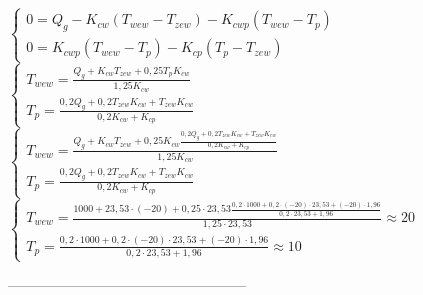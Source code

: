 \documentclass{article}
\begin{document}
\begin{center}
\vspace{1ex}
    $
    \begin{cases}
        0=Q_{g} -K_{cw} (T_{wew} - T_{zew})-K_{cwp} (T_{wew} -T_{p})\\
        0=K_{cwp}(T_{wew}-T_{p})-K_{cp}(T_{p}-T_{zew})
    \end{cases}
    $
    \\
    \vspace{1ex}
    $
    \begin{cases}
        T_{wew}=\frac{Q_{g}+K_{cw}T_{zew}+0,25T_{p}K_{cw}}{1,25K_{cw}}\\
        T_{p}=\frac{0,2Q_{g}+0,2T_{zew}K_{cw}+T_{zew}K_{cw}}{0,2K_{cw}+K_{cp}}
    \end{cases}
    $
    \\
    \vspace{1ex}
    $
    \begin{cases}
        T_{wew}=\frac{Q_{g}+K_{cw}T_{zew}+0,25K_{cw}\frac{0,2Q_{g}+0,2T_{zew}K_{cw}+T_{zew}K_{cw}}{0,2K_{cw}+K_{cp}}}{1,25K_{cw}}\\
        T_{p}=\frac{0,2Q_{g}+0,2T_{zew}K_{cw}+T_{zew}K_{cw}}{0,2K_{cw}+K_{cp}}
    \end{cases}
    $
    \\
    \vspace{1ex}
    $
    \begin{cases}
        T_{wew}=\frac{1000+23,53\cdot(-20)+0,25\cdot23,53\frac{0,2\cdot1000+0,2\cdot(-20)\cdot23,53+(-20)\cdot1,96}{0,2\cdot23,53+1,96}}{1,25\cdot23,53} \approx 20\\
        T_{p}=\frac{0,2\cdot1000+0,2\cdot(-20)\cdot23,53+(-20)\cdot1,96}{0,2\cdot23,53+1,96} \approx 10
    \end{cases}
    $
\end{center}




---------------------------------------------------
\end{document}
